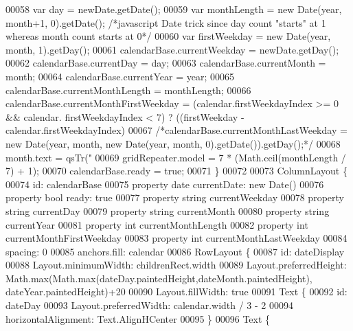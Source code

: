 \begin{DoxyCode}
{00058         var day = newDate.getDate();
00059         var monthLength = \textcolor{keyword}{new} Date(year, month+1, 0).getDate(); \textcolor{comment}{/*javascript Date trick since day count
       "starts" at 1 whereas month count starts at 0*/}
00060         var firstWeekday = \textcolor{keyword}{new} Date(year, month, 1).getDay();
00061         calendarBase.currentWeekday = newDate.getDay();
00062         calendarBase.currentDay = day;
00063         calendarBase.currentMonth = month;
00064         calendarBase.currentYear = year;
00065         calendarBase.currentMonthLength = monthLength;
00066         calendarBase.currentMonthFirstWeekday = (calendar.firstWeekdayIndex >= 0 && calendar.
      firstWeekdayIndex < 7) ? ((firstWeekday - calendar.firstWeekdayIndex) %
00067         \textcolor{comment}{/*calendarBase.currentMonthLastWeekday = new Date(year, month, new Date(year, month,
       0).getDate()).getDay();*/}
00068         month.text = qsTr(\textcolor{stringliteral}{"%
00069         gridRepeater.model = 7 * (Math.ceil(monthLength / 7) + 1);
00070         calendarBase.ready = \textcolor{keyword}{true};
00071     \}
00072 
00073     ColumnLayout \{
00074         \textcolor{keywordtype}{id}: calendarBase
00075         \textcolor{keyword}{property} date currentDate: \textcolor{keyword}{new} Date()
00076         property \textcolor{keywordtype}{bool} ready: true
00077         property \textcolor{keywordtype}{string} currentWeekday
00078         property \textcolor{keywordtype}{string} currentDay
00079         property \textcolor{keywordtype}{string} currentMonth
00080         property \textcolor{keywordtype}{string} currentYear
00081         property \textcolor{keywordtype}{int} currentMonthLength
00082         property \textcolor{keywordtype}{int} currentMonthFirstWeekday
00083         property \textcolor{keywordtype}{int} currentMonthLastWeekday
00084         spacing: 0
00085         anchors.fill: calendar
00086         RowLayout \{
00087             \textcolor{keywordtype}{id}: dateDisplay
00088             Layout.minimumWidth: childrenRect.width
00089             Layout.preferredHeight: Math.max(Math.max(dateDay.paintedHeight,dateMonth.paintedHeight),
      dateYear.paintedHeight)+20
00090             Layout.fillWidth: \textcolor{keyword}{true}
00091             Text \{
00092                 \textcolor{keywordtype}{id}: dateDay
00093                 Layout.preferredWidth: calendar.width / 3 - 2
00094                 horizontalAlignment: Text.AlignHCenter
00095             \}
00096             Text \{
}}
\end{DoxyCode}

